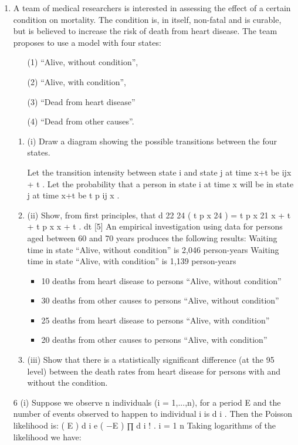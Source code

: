 \documentclass[a4paper,12pt]{article}
\begin{document}
\begin{enumerate}
\item %
A team of medical researchers is interested in assessing the effect of a certain
condition on mortality. The condition is, in itself, non-fatal and is curable, but is
believed to increase the risk of death from heart disease. The team proposes to use a
model with four states: 
\begin{itemize}
\item[(1)] “Alive, without condition”, 
\item[(2)] “Alive, with condition”,
\item[(3)] “Dead from heart disease” 
\item[(4)] “Dead from other causes”.
\end{itemize}

\begin{enumerate}
\item (i)
Draw a diagram showing the possible transitions between the four states.

Let the transition intensity between state i and state j at time x+t be \mu ijx + t . Let the
probability that a person in state i at time x will be in state j at time x+t be t p ij x .
\item (ii)
Show, from first principles, that
d
22 24
( t p x 24 ) = t p x 21 
x + t + t p x \mu x + t .
dt
[5]
An empirical investigation using data for persons aged between 60 and 70 years produces the following results:
Waiting time in state “Alive, without condition” is 2,046 person-years
Waiting time in state “Alive, with condition” is 1,139 person-years
\begin{itemize}
\item 10 deaths from heart disease to persons “Alive, without condition”
\item 30 deaths from other causes to persons “Alive, without condition”
\item 25 deaths from heart disease to persons “Alive, with condition”
\item 20 deaths from other causes to persons “Alive, with condition”
\end{itemize}

\item (iii)
Show that there is a statistically significant difference (at the 95%
level) between the death rates from heart disease for persons with and without
the condition.

\end{enumerate}
6
(i)
Suppose we observe n individuals (i = 1,...,n), for a period E and the number
of events observed to happen to individual i is d i .
Then the Poisson likelihood is:
( \mu E ) d i e ( −\mu E )
∏ d i ! .
i = 1
n
Taking logarithms of the likelihood we have:


\end{enumerate}
\end{document}
